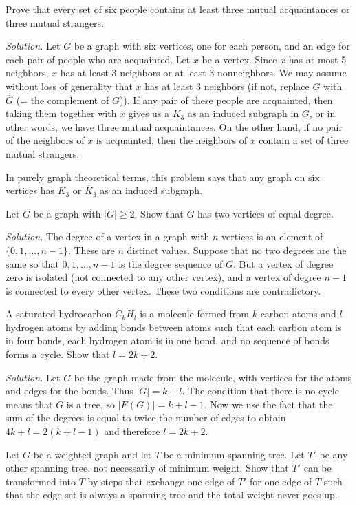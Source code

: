 \documentclass[10pt,reqno]{amsart}
\begin{document}
\begin{outline}[enumerate]
\1 Prove that every set of six people contains at least three mutual
acquaintances or three mutual strangers.

\medskip
\noindent \emph{Solution.} Let $G$ be a graph with six vertices, one for each
person, and an edge for each pair of people who are acquainted. Let $x$ be a
vertex. Since $x$ has at most 5 neighbors, $x$ has at least 3 neighbors or at
least 3 nonneighbors. We may assume without loss of generality that $x$ has at
least 3 neighbors (if not, replace $G$ with $\overline{G}$ (= the complement of
$G$)). If any pair of these people are acquainted, then taking them together
with $x$ gives us a $K_3$ as an induced subgraph in $G$, or in other words, we
have three mutual acquaintances. On the other hand, if no pair of the neighbors
of $x$ is acquainted, then the neighbors of $x$ contain a set of three mutual
strangers.

In purely graph theoretical terms, this problem says that any graph on six
vertices has $K_3$ or $\overline{K}_3$ as an induced subgraph.

\medskip
\1 Let $G$ be a graph with $|G| \ge 2.$ Show that $G$ has two vertices of equal
degree.

\medskip
\noindent \emph{Solution.} The degree of a vertex in a graph with $n$ vertices
is an element of \(\{0,1,\dots,n-1\}\). These are $n$ distinct values. Suppose
that no two degrees are the same so that $0,1,\dots,n-1$ is the degree sequence
of $G$. But a vertex of degree zero is isolated (not connected to any other
vertex), and a vertex of degree $n-1$ is connected to every other vertex. These
two conditions are contradictory.

\medskip

\medskip
\1 A saturated hydrocarbon $C_k H_l$ is a molecule formed from $k$ carbon atoms
and $l$ hydrogen atoms by adding bonds between atoms such that each carbon atom
is in four bonds, each hydrogen atom is in one bond, and no sequence of bonds
forms a cycle. Show that $l = 2k+2.$

\medskip
\noindent \emph{Solution.} Let $G$ be the graph made from the molecule, with
vertices for the atoms and edges for the bonds. Thus $|G| = k+l$. The condition
that there is no cycle means that $G$ is a tree, so $|E(G)| = k+l-1$. Now we
use the fact that the sum of the degrees is equal to twice the number of edges
to obtain \(4k+l = 2(k+l-1)\) and therefore $l=2k+2.$
\medskip

\medskip
\1 Let $G$ be a weighted graph and let $T$ be a minimum spanning tree. Let $T'$
be any other spanning tree, not necessarily of minimum weight. Show that $T'$
can be transformed into $T$ by steps that exchange one edge of $T'$ for one
edge of $T$ such that the edge set is always a spanning tree and the total
weight never goes up.


\end{outline}
\end{document}
